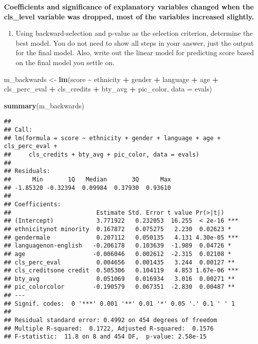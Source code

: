 \documentclass[
]{article}
\newenvironment{Shaded}{\begin{snugshade}}{\end{snugshade}}
\newcommand{\AttributeTok}[1]{\textcolor[rgb]{0.13,0.29,0.53}{#1}}
\newcommand{\FunctionTok}[1]{\textcolor[rgb]{0.13,0.29,0.53}{\textbf{#1}}}
\newcommand{\NormalTok}[1]{#1}
\newcommand{\OtherTok}[1]{\textcolor[rgb]{0.56,0.35,0.01}{#1}}
\newcommand{\SpecialCharTok}[1]{\textcolor[rgb]{0.81,0.36,0.00}{\textbf{#1}}}
\providecommand{\tightlist}{%
  \setlength{\itemsep}{0pt}\setlength{\parskip}{0pt}}
\begin{document}
\textbf{Coefficients and significance of explanatory variables changed
when the cls\_level variable was dropped, most of the variables
increased slightly.}

\begin{enumerate}
\def\labelenumi{\arabic{enumi}.}
\setcounter{enumi}{14}
\tightlist
\item
  Using backward-selection and p-value as the selection criterion,
  determine the best model. You do not need to show all steps in your
  answer, just the output for the final model. Also, write out the
  linear model for predicting score based on the final model you settle
  on.
\end{enumerate}

\begin{Shaded}
\begin{Highlighting}[]
\NormalTok{m\_backwards }\OtherTok{\textless{}{-}} \FunctionTok{lm}\NormalTok{(score }\SpecialCharTok{\textasciitilde{}}\NormalTok{ ethnicity }\SpecialCharTok{+}\NormalTok{ gender }\SpecialCharTok{+}\NormalTok{ language }\SpecialCharTok{+}\NormalTok{ age }\SpecialCharTok{+}\NormalTok{ cls\_perc\_eval }\SpecialCharTok{+}\NormalTok{ cls\_credits }\SpecialCharTok{+}\NormalTok{ bty\_avg }\SpecialCharTok{+}\NormalTok{ pic\_color, }\AttributeTok{data =}\NormalTok{ evals)}

\FunctionTok{summary}\NormalTok{(m\_backwards)}
\end{Highlighting}
\end{Shaded}

\begin{verbatim}
## 
## Call:
## lm(formula = score ~ ethnicity + gender + language + age + cls_perc_eval + 
##     cls_credits + bty_avg + pic_color, data = evals)
## 
## Residuals:
##      Min       1Q   Median       3Q      Max 
## -1.85320 -0.32394  0.09984  0.37930  0.93610 
## 
## Coefficients:
##                        Estimate Std. Error t value Pr(>|t|)    
## (Intercept)            3.771922   0.232053  16.255  < 2e-16 ***
## ethnicitynot minority  0.167872   0.075275   2.230  0.02623 *  
## gendermale             0.207112   0.050135   4.131 4.30e-05 ***
## languagenon-english   -0.206178   0.103639  -1.989  0.04726 *  
## age                   -0.006046   0.002612  -2.315  0.02108 *  
## cls_perc_eval          0.004656   0.001435   3.244  0.00127 ** 
## cls_creditsone credit  0.505306   0.104119   4.853 1.67e-06 ***
## bty_avg                0.051069   0.016934   3.016  0.00271 ** 
## pic_colorcolor        -0.190579   0.067351  -2.830  0.00487 ** 
## ---
## Signif. codes:  0 '***' 0.001 '**' 0.01 '*' 0.05 '.' 0.1 ' ' 1
## 
## Residual standard error: 0.4992 on 454 degrees of freedom
## Multiple R-squared:  0.1722, Adjusted R-squared:  0.1576 
## F-statistic:  11.8 on 8 and 454 DF,  p-value: 2.58e-15
\end{verbatim}
\end{document}
